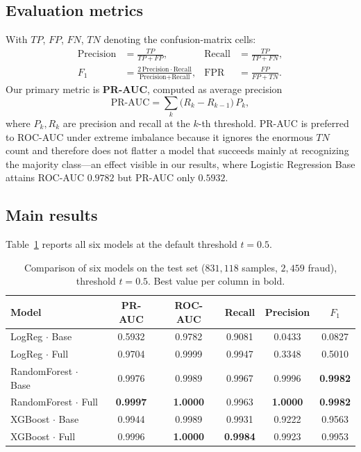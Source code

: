 \documentclass{article}
\begin{document}
\subsection{Evaluation metrics}
\label{subsec:metrics}
With $TP$, $FP$, $FN$, $TN$ denoting the confusion-matrix cells:
\begin{align}
\text{Precision} &= \frac{TP}{TP + FP}, &
\text{Recall} &= \frac{TP}{TP + FN}, \label{eq:pr}\\
F_1 &= \frac{2\,\text{Precision}\cdot\text{Recall}}{\text{Precision} + \text{Recall}}, &
\text{FPR} &= \frac{FP}{FP + TN}. \label{eq:f1}
\end{align}
Our primary metric is \textbf{PR-AUC}, computed as average precision
\begin{equation}
\text{PR-AUC} = \sum_{k} \bigl(R_k - R_{k-1}\bigr)\, P_k,
\label{eq:prauc}
\end{equation}
where $P_k, R_k$ are precision and recall at the $k$-th threshold.
PR-AUC is preferred to ROC-AUC under extreme imbalance because it
ignores the enormous $TN$ count and therefore does not flatter a model
that succeeds mainly at recognizing the majority class---an effect
visible in our results, where Logistic Regression Base attains ROC-AUC
$0.9782$ but PR-AUC only $0.5932$.

\subsection{Main results}
Table~\ref{tab:models} reports all six models at the default threshold
$t = 0.5$.

\begin{table}[H]
\centering
\caption{Comparison of six models on the test set ($831{,}118$ samples,
$2{,}459$ fraud), threshold $t = 0.5$. Best value per column in bold.}
\label{tab:models}
\small
\begin{tabular}{lccccc}
\toprule
Model & PR-AUC & ROC-AUC & Recall & Precision & $F_1$ \\
\midrule
LogReg $\cdot$ Base       & 0.5932 & 0.9782 & 0.9081 & 0.0433 & 0.0827 \\
LogReg $\cdot$ Full       & 0.9704 & 0.9999 & 0.9947 & 0.3348 & 0.5010 \\
RandomForest $\cdot$ Base & 0.9976 & 0.9989 & 0.9967 & 0.9996 & \textbf{0.9982} \\
RandomForest $\cdot$ Full & \textbf{0.9997} & \textbf{1.0000} & 0.9963 & \textbf{1.0000} & \textbf{0.9982} \\
XGBoost $\cdot$ Base      & 0.9944 & 0.9989 & 0.9931 & 0.9222 & 0.9563 \\
XGBoost $\cdot$ Full      & 0.9996 & \textbf{1.0000} & \textbf{0.9984} & 0.9923 & 0.9953 \\
\bottomrule
\end{tabular}
\end{table}
\end{document}
